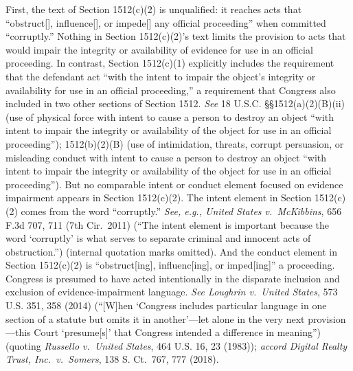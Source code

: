 First, the text of Section 1512(c)(2) is unqualified: it reaches acts that “obstruct[], influence[], or impede[] any official proceeding” when committed “corruptly.”
Nothing in Section 1512(c)(2)’s text limits the provision to acts that would impair the integrity or availability of evidence for use in an official proceeding.
In contrast, Section 1512(c)(1) explicitly includes the requirement that the defendant act “with the intent to impair the object’s integrity or availability for use in an official proceeding,” a requirement that Congress also included in two other sections of Section 1512.
\textit{See} 18 U.S.C. \S\S 1512(a)(2)(B)(ii) (use of physical force with intent to cause a person to destroy an object “with intent to impair the integrity or availability of the object for use in an official proceeding”);
1512(b)(2)(B) (use of intimidation, threats, corrupt persuasion, or misleading conduct with intent to cause a person to destroy an object “with intent to impair the integrity or availability of the object for use in an official proceeding”).
But no comparable intent or conduct element focused on evidence impairment appears in Section 1512(c)(2).
The intent element in Section 1512(c)(2) comes from the word “corruptly.”
\textit{See, e.g., United States v.\ McKibbins}, 656 F.3d 707, 711 (7th Cir.~2011) (“The intent element is important because the word ‘corruptly’ is what serves to separate criminal and innocent acts of obstruction.”) (internal quotation marks omitted).
And the conduct element in Section 1512(c)(2) is “obstruct[ing], influenc[ing], or imped[ing]” a proceeding.
Congress is presumed to have acted intentionally in the disparate inclusion and exclusion of evidence-impairment language.
\textit{See Loughrin v.\ United States}, 573 U.S. 351, 358 (2014) (“[W]hen ‘Congress includes particular language in one section of a statute but omits it in another’---let alone in the very next provision---this Court ‘presume[s]’ that Congress intended a difference in meaning”) (quoting \textit{Russello v.\ United States}, 464 U.S. 16, 23 (1983));
\textit{accord Digital Realty Trust, Inc.\ v.\ Somers}, 138 S. Ct.~767, 777 (2018).


